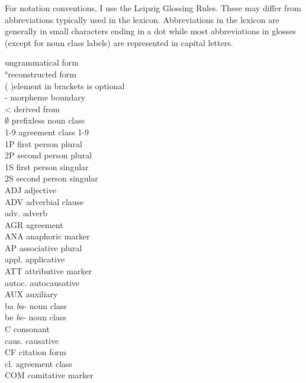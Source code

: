 For notation conventions, I use the Leipzig Glossing Rules. These may differ from abbreviations typically used in the lexicon. Abbreviations in the lexicon are generally in small characters ending in a dot while most abbreviations in glosses (except for noun class labels)  are represented in capital letters.


\begin{multicols}{2}

\noindent * \hfill ungrammatical form  \\
°\hfill reconstructed form  \\
( )\hfill  element in brackets is optional   \\
- \hfill morpheme boundary \\
<  \hfill derived from \\
$\emptyset$ \hfill prefixless noun class\\
1-9 \hfill  agreement class 1-9   \\
1P  \hfill first person plural    \\
2P  \hfill second person plural    \\
1S  \hfill first person singular    \\
2S  \hfill second person singular    \\
ADJ \hfill adjective \\
ADV \hfill adverbial clause \\
adv.  \hfill adverb    \\
AGR  \hfill agreement    \\
ANA \hfill anaphoric marker \\ 
AP  \hfill associative plural   \\
appl. \hfill applicative \\
ATT  \hfill attributive marker   \\
autoc. \hfill autocausative \\
AUX \hfill auxiliary \\
ba  \hfill {\it ba}- noun class \\
be \hfill {\it be}- noun class \\
C \hfill consonant    \\
caus. \hfill causative \\
CF \hfill citation form    \\
cl. \hfill agreement class    \\
COM \hfill comitative marker \\

\end{multicols}
